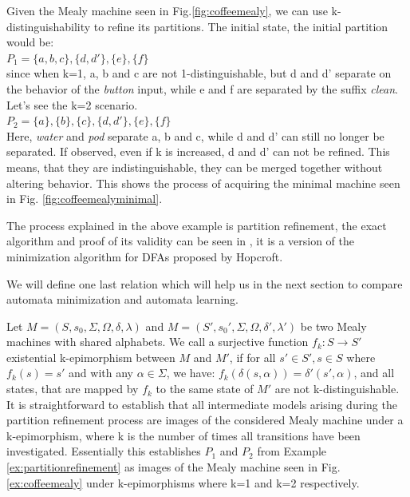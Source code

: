 \begin{example}
	Given the Mealy machine seen in Fig.\ref{fig:coffeemealy}, we can use k-distinguishability to refine its partitions. The initial state, the initial partition would be:\\
	$P_1 = \{a, b, c\}, \{d, d'\}, \{e\}, \{f\}$\\
	since when k=1, a, b and c are not 1-distinguishable, but d and d' separate on the behavior of the \textit{button} input, while e and f are separated by the suffix \textit{clean}. Let's see the k=2 scenario.\\
	$P_2 = \{a\}, \{b\}, \{c\}, \{d, d'\}, \{e\}, \{f\}$\\
	Here, \textit{water} and \textit{pod} separate a, b and c, while d and d' can still no longer be separated. If observed, even if k is increased, d and d' can not be refined. This means, that they are indistinguishable, they can be merged together without altering behavior. This shows the process of acquiring the minimal machine seen in Fig. \ref{fig:coffeemealyminimal}.
	\label{ex:partitionrefinement}
\end{example} 

The process explained in the above example is partition refinement, the exact algorithm and proof of its validity can be seen in \cite{Steffen2011}, it is a version of the minimization algorithm for DFAs proposed by Hopcroft\cite{HOPCROFT1971189}. 

We will define one last relation which will help us in the next section to compare automata minimization and automata learning.

Let  $M=(S,s_{0},\Sigma,\Omega,\delta,\lambda)$ and $M=(S',s_{0}',\Sigma,\Omega,\delta',\lambda')$ be two Mealy machines with shared alphabets. We call a surjective function $f_k: S \to S'$ existential k-epimorphism between $M$ and $M'$, if for all $s'\in S', s\in S$ where $f_k(s) = s'$ and with any $\alpha\in\Sigma$, we have: $f_k(\delta(s,\alpha)) = \delta'(s',\alpha)$, and all states, that are mapped by $f_k$ to the same state of $M'$ are not k-distinguishable. It is straightforward to establish that all intermediate models arising during the partition refinement process are images of the considered Mealy machine under a k-epimorphism, where k is the number of times all transitions have been investigated.\cite{Steffen2011} Essentially this establishes $P_1$ and $P_2$ from Example \ref*{ex:partitionrefinement} as images of the Mealy machine seen in Fig. \ref{ex:coffeemealy} under k-epimorphisms where k=1 and k=2 respectively.

